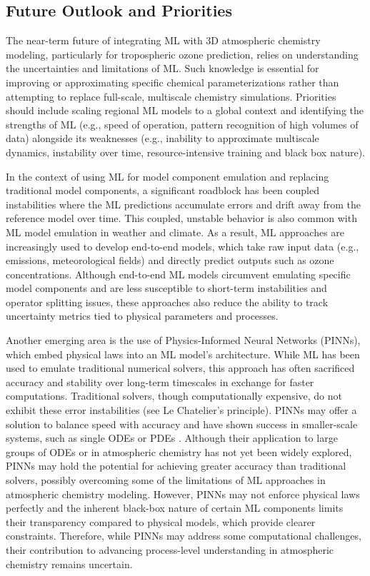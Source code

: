 \documentclass[gmd, manuscript]{copernicus}
\begin{document}
\subsection{Future Outlook and Priorities}

The near-term future of integrating ML with 3D atmospheric chemistry modeling, particularly for tropospheric ozone prediction, relies on understanding the uncertainties and limitations of ML. Such knowledge is essential for improving or approximating specific chemical parameterizations rather than attempting to replace full-scale, multiscale chemistry simulations. Priorities should include scaling regional ML models to a global context and identifying the strengths of ML (e.g., speed of operation, pattern recognition of high volumes of data) alongside its weaknesses (e.g., inability to approximate multiscale dynamics, instability over time, resource-intensive training and black box nature). 

In the context of using ML for model component emulation and replacing traditional model components, a significant roadblock has been coupled instabilities where the ML predictions accumulate errors and drift away from the reference model over time. This coupled, unstable behavior is also common with ML model emulation in weather and climate. As a result, ML approaches are increasingly used to develop end-to-end models, which take raw input data (e.g., emissions, meteorological fields) and directly predict outputs such as ozone concentrations. Although end-to-end ML models circumvent emulating specific model components and are less susceptible to short-term instabilities and operator splitting issues, these approaches also reduce the ability to track uncertainty metrics tied to physical parameters and processes.
 
Another emerging area is the use of Physics-Informed Neural Networks (PINNs), which embed physical laws into an ML model’s architecture. While ML has been used to emulate traditional numerical solvers, this approach has often sacrificed accuracy and stability over long-term timescales in exchange for faster computations. Traditional solvers, though computationally expensive, do not exhibit these error instabilities (see Le Chatelier’s principle). PINNs may offer a solution to balance speed with accuracy and have shown success in smaller-scale systems, such as single ODEs or PDEs \citep{karniadakis_physics-informed_2021}. Although their application to large groups of ODEs or in atmospheric chemistry has not yet been widely explored, PINNs may hold the potential for achieving greater accuracy than traditional solvers, possibly overcoming some of the limitations of ML approaches in atmospheric chemistry modeling. However, PINNs may not enforce physical laws perfectly and the inherent black-box nature of certain ML components limits their transparency compared to physical models, which provide clearer constraints. Therefore, while PINNs may address some computational challenges, their contribution to advancing process-level understanding in atmospheric chemistry remains uncertain.
\end{document}

